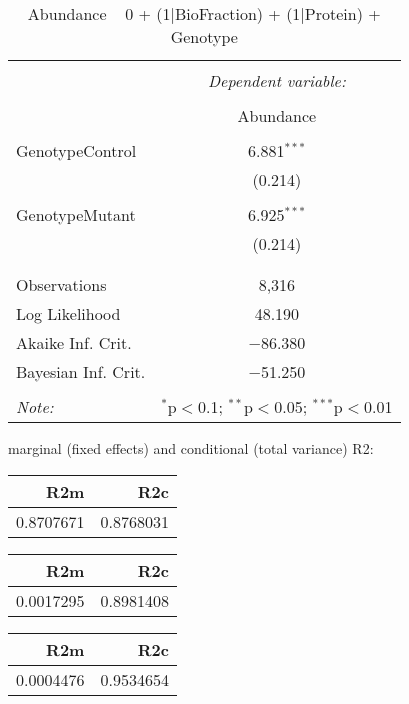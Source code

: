 \documentclass[11pt]{report}
\begin{document}
\begin{table}[!htbp] \centering 
  \caption{Abundance ~ 0 + (1|BioFraction) + (1|Protein) + Genotype} 
  \label{} 
\begin{tabular}{@{\extracolsep{5pt}}lc} 
\\[-1.8ex]\hline 
\hline \\[-1.8ex] 
 & \multicolumn{1}{c}{\textit{Dependent variable:}} \\ 
\cline{2-2} 
\\[-1.8ex] & Abundance \\ 
\hline \\[-1.8ex] 
 GenotypeControl & 6.881$^{***}$ \\ 
  & (0.214) \\ 
  & \\ 
 GenotypeMutant & 6.925$^{***}$ \\ 
  & (0.214) \\ 
  & \\ 
\hline \\[-1.8ex] 
Observations & 8,316 \\ 
Log Likelihood & 48.190 \\ 
Akaike Inf. Crit. & $-$86.380 \\ 
Bayesian Inf. Crit. & $-$51.250 \\ 
\hline 
\hline \\[-1.8ex] 
\textit{Note:}  & \multicolumn{1}{r}{$^{*}$p$<$0.1; $^{**}$p$<$0.05; $^{***}$p$<$0.01} \\ 
\end{tabular} 
\end{table} 
marginal (fixed effects) and conditional (total variance) R2:

\begin{tabular}{r|r}
\hline
R2m & R2c\\
\hline
0.8707671 & 0.8768031\\
\hline
\end{tabular}

\begin{tabular}{r|r}
\hline
R2m & R2c\\
\hline
0.0017295 & 0.8981408\\
\hline
\end{tabular}

\begin{tabular}{r|r}
\hline
R2m & R2c\\
\hline
0.0004476 & 0.9534654\\
\hline
\end{tabular}
\end{document}
